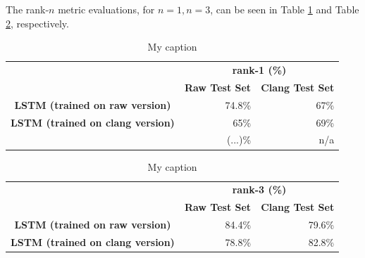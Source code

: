 The rank-$n$ metric evaluations, for $n = 1, n = 3$, can be seen in Table \ref{tab:rank1} and Table \ref{tab:rank3}, respectively.

\begin{table}[bh]
	\centering
	\begin{tabular}{ccr}
		\cline{2-3}
		\multicolumn{1}{l}{}                     & \multicolumn{2}{c}{\textbf{rank-1 (\%)}}                                          \\ \cline{2-3} 
		\textbf{}                                & \textbf{Raw Test Set}               & \multicolumn{1}{l}{\textbf{Clang Test Set}} \\ \hline
		\textbf{LSTM (trained on raw version)}   & \multicolumn{1}{r}{74.8\%} & 67\%                      \\ \hline
		\textbf{LSTM (trained on clang version)} & \multicolumn{1}{r}{65\%}   & 69\%                             \\ \hline
		\textbf{\citeauthoronline{caliskan_2015}} & \multicolumn{1}{r}{(...)\%}   & n/a                            \\ \hline
	\end{tabular}
	\caption{My caption}
	\label{tab:rank1}
\end{table}

\begin{table}[bh]
	\centering
	\begin{tabular}{ccr}
		\cline{2-3}
		\multicolumn{1}{l}{}                     & \multicolumn{2}{c}{\textbf{rank-3 (\%)}}                                          \\ \cline{2-3} 
		\textbf{}                                & \textbf{Raw Test Set}               & \multicolumn{1}{l}{\textbf{Clang Test Set}} \\ \hline
		\textbf{LSTM (trained on raw version)}   & \multicolumn{1}{r}{84.4\%} & 79.6\%                               \\ \hline
		\textbf{LSTM (trained on clang version)} & \multicolumn{1}{r}{78.8\%}   & 82.8\%                               \\ \hline
	\end{tabular}
	\caption{My caption}
	\label{tab:rank3}
\end{table}